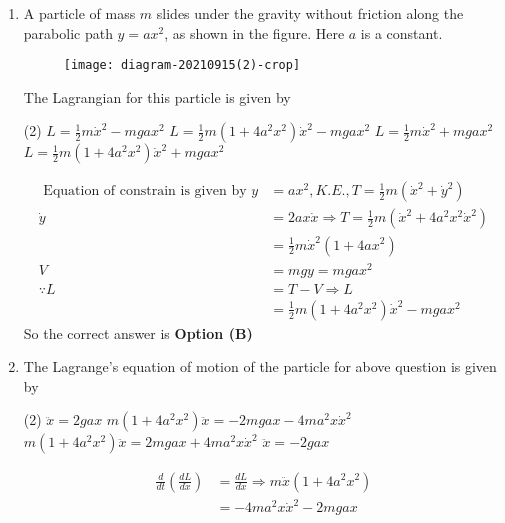 \begin{enumerate}
	\item A particle of mass $m$ slides under the gravity without friction along the parabolic path $y=a x^{2}$, as shown in the figure. Here $a$ is a constant.\\
	\begin{figure}[H]
		\centering
		\texttt{[image: diagram-20210915(2)-crop]}
	\end{figure}
	The Lagrangian for this particle is given by
{	}
\begin{tasks}(2)
\task[\textbf{A.}] $L=\frac{1}{2} m \dot{x}^{2}-m g a x^{2}$
\task[\textbf{B.}] $L=\frac{1}{2} m\left(1+4 a^{2} x^{2}\right) \dot{x}^{2}-m g a x^{2}$
\task[\textbf{C.}] $L=\frac{1}{2} m \dot{x}^{2}+m g a x^{2}$
\task[\textbf{D.}] $L=\frac{1}{2} m\left(1+4 a^{2} x^{2}\right) \dot{x}^{2}+m g a x^{2}$
\end{tasks}
\begin{answer}
\begin{align*}
\text{	Equation of constrain is given by }y&=a x^{2}, K.E., T=\frac{1}{2}m\left(\dot{x}^{2}+\dot{y}^{2}\right)\\
\dot{y}&=2 a x \dot{x} \Rightarrow T=\frac{1}{2} m\left(\dot{x}^{2}+4 a^{2} x^{2} \dot{x}^{2}\right)\\&=\frac{1}{2} m \dot{x}^{2}\left(1+4 a x^{2}\right) \\
V&=m g y=m g a x^{2}\\
\because L&=T-V \Rightarrow L\\&=\frac{1}{2} m\left(1+4 a^{2} x^{2}\right) \dot{x}^{2}-m g a x^{2}
\end{align*}
So the correct answer is \textbf{Option (B)}
\end{answer}
\item  The Lagrange's equation of motion of the particle for above question is given by
{}
\begin{tasks}(2)
\task[\textbf{A.}] $\ddot{x}=2 g a x$
\task[\textbf{B.}] $m\left(1+4 a^{2} x^{2}\right) \ddot{x}=-2 m g a x-4 m a^{2} x \dot{x}^{2}$
\task[\textbf{C.}] $m\left(1+4 a^{2} x^{2}\right) \ddot{x}=2 m g a x+4 m a^{2} x \dot{x}^{2}$
\task[\textbf{D.}] $\ddot{x}=-2 g a x$
\end{tasks}
\begin{answer}
\begin{align*}
\frac{d}{d t}\left(\frac{d L}{d \dot{x}}\right)&=\frac{d L}{d x} \Rightarrow m \ddot{x}\left(1+4 a^{2} x^{2}\right)\\&=-4 m a^{2} x \dot{x}^{2}-2 m g a x

\end{align*}
\end{answer}
\end{enumerate}
